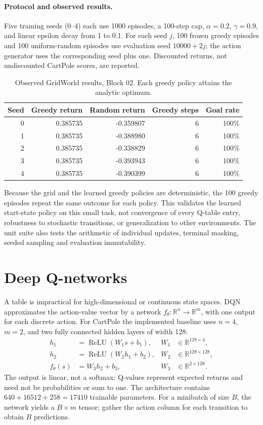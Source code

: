 \documentclass[11pt,a4paper]{article}
\newcommand{\R}{\mathbb R}
\begin{document}
\paragraph{Protocol and observed results.} Five training seeds (0--4) each use 1000 episodes, a 100-step cap, $\alpha=0.2$, $\gamma=0.9$, and linear epsilon decay from 1 to 0.1. For each seed $j$, 100 frozen greedy episodes and 100 uniform-random episodes use evaluation seed $10000+2j$; the action generator uses the corresponding seed plus one. Discounted returns, not undiscounted CartPole scores, are reported.
\begin{table}[ht]
\centering
\caption{Observed GridWorld results, Block 02. Each greedy policy attains the analytic optimum.}
\begin{tabular}{rrrrr}
\toprule
Seed & Greedy return & Random return & Greedy steps & Goal rate\\
\midrule
0 & 0.385735 & -0.359807 & 6 & 100\%\\
1 & 0.385735 & -0.388980 & 6 & 100\%\\
2 & 0.385735 & -0.338829 & 6 & 100\%\\
3 & 0.385735 & -0.393943 & 6 & 100\%\\
4 & 0.385735 & -0.390399 & 6 & 100\%\\
\bottomrule
\end{tabular}
\end{table}
Because the grid and the learned greedy policies are deterministic, the 100 greedy episodes repeat the same outcome for each policy. This validates the learned start-state policy on this small task, not convergence of every Q-table entry, robustness to stochastic transitions, or generalization to other environments. The unit suite also tests the arithmetic of individual updates, terminal masking, seeded sampling and evaluation immutability.

\section{Deep Q-networks}
A table is impractical for high-dimensional or continuous state spaces. DQN \cite{mnih} approximates the action-value vector by a network $f_\theta:\R^n\to\R^m$, with one output for each discrete action. For CartPole the implemented baseline uses $n=4$, $m=2$, and two fully connected hidden layers of width 128:
\begin{align*}
 h_1&=\operatorname{ReLU}(W_1s+b_1),& W_1&\in\R^{128\times4},\\
 h_2&=\operatorname{ReLU}(W_2h_1+b_2),& W_2&\in\R^{128\times128},\\
 f_\theta(s)&=W_3h_2+b_3,& W_3&\in\R^{2\times128}.
\end{align*}
The output is linear, not a softmax: Q-values represent expected returns and need not be probabilities or sum to one. The architecture contains $640+16512+258=17410$ trainable parameters. For a minibatch of size $B$, the network yields a $B\times m$ tensor; gather the action column for each transition to obtain $B$ predictions.
\end{document}
